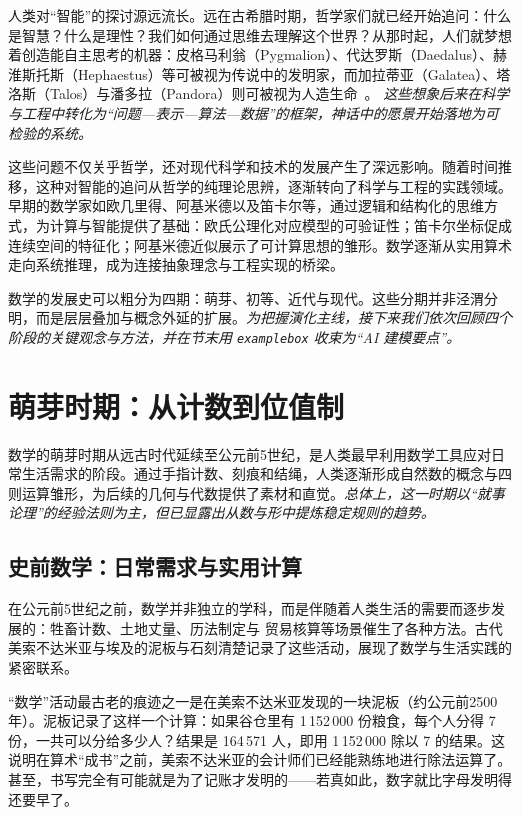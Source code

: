 人类对“智能”的探讨源远流长。远在古希腊时期，哲学家们就已经开始追问：什么是智慧？什么是理性？我们如何通过思维去理解这个世界？从那时起，人们就梦想着创造能自主思考的机器：皮格马利翁（Pygmalion）、代达罗斯（Daedalus）、赫淮斯托斯（Hephaestus）等可被视为传说中的发明家，而加拉蒂亚（Galatea）、塔洛斯（Talos）与潘多拉（Pandora）则可被视为人造生命~{\cite{OvidMartin2004,Sparkes1996,Tandy1997}}。 \emph{这些想象后来在科学与工程中转化为“问题—表示—算法—数据”的框架，神话中的愿景开始落地为可检验的系统。}

这些问题不仅关乎哲学，还对现代科学和技术的发展产生了深远影响。随着时间推移，这种对智能的追问从哲学的纯理论思辨，逐渐转向了科学与工程的实践领域。早期的数学家如欧几里得、阿基米德以及笛卡尔等，通过逻辑和结构化的思维方式，为计算与智能提供了基础：欧氏公理化对应模型的可验证性；笛卡尔坐标促成连续空间的特征化；阿基米德近似展示了可计算思想的雏形。数学逐渐从实用算术走向系统推理，成为连接抽象理念与工程实现的桥梁。

数学的发展史可以粗分为四期：萌芽、初等、近代与现代。这些分期并非泾渭分明，而是层层叠加与概念外延的扩展。\emph{为把握演化主线，接下来我们依次回顾四个阶段的关键观念与方法，并在节末用 \texttt{examplebox} 收束为“AI 建模要点”。}

\section{萌芽时期：从计数到位值制}

数学的萌芽时期从远古时代延续至公元前5世纪，是人类最早利用数学工具应对日常生活需求的阶段。通过手指计数、刻痕和结绳，人类逐渐形成自然数的概念与四则运算雏形，为后续的几何与代数提供了素材和直觉。\emph{总体上，这一时期以“就事论理”的经验法则为主，但已显露出从数与形中提炼稳定规则的趋势。}

\subsection{史前数学：日常需求与实用计算}

在公元前5世纪之前，数学并非独立的学科，而是伴随着人类生活的需要而逐步发展的：牲畜计数、土地丈量、历法制定与  贸易核算等场景催生了各种方法。古代美索不达米亚与埃及的泥板与石刻清楚记录了这些活动，展现了数学与生活实践的紧密联系。

“数学”活动最古老的痕迹之一是在美索不达米亚发现的一块泥板（约公元前2500年）。泥板记录了这样一个计算：如果谷仓里有 1\,152\,000 份粮食，每个人分得 7 份，一共可以分给多少人？结果是 164\,571 人，即用 1\,152\,000 除以 7 的结果。这说明在算术“成书”之前，美索不达米亚的会计师们已经能熟练地进行除法运算了。甚至，书写完全有可能就是为了记账才发明的——若真如此，数字就比字母发明得还要早了。

